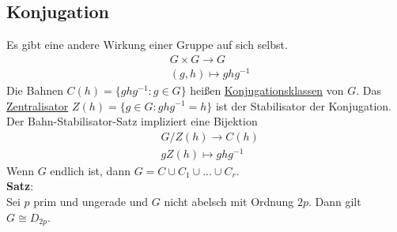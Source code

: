 \documentclass[a4paper, 12pt]{article}
\begin{document}
\subsection{Konjugation}
Es gibt eine andere Wirkung einer Gruppe auf sich selbst. \begin{eqnarray*}
	&G\times G \to G\\
	&(g,h) \mapsto ghg^{-1}
\end{eqnarray*}
Die Bahnen $C(h) = \{ghg^{-1}: g \in G\}$ heißen \underline{Konjugationsklassen} von $G$. Das \underline{Zentralisator} $Z(h) = \{g \in G: ghg^{-1} = h\}$ ist der Stabilisator der Konjugation. Der Bahn-Stabilisator-Satz impliziert eine Bijektion \begin{eqnarray*}
	&G/Z(h) \to C(h)\\
	&gZ(h) \mapsto ghg^{-1}
\end{eqnarray*}
Wenn $G$ endlich ist, dann $G = C\cup C_1 \cup ... \cup C_r$.\\
\textbf{Satz}:\\
Sei $p$ prim und ungerade und $G$ nicht abelsch mit Ordnung $2p$. Dann gilt $G\cong D_{2p}$.
\end{document}
